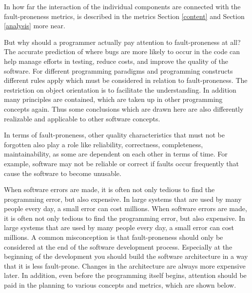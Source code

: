 In how far the interaction of the individual components are connected with the fault-proneness metrics, is described in the metrics Section \ref{content} and Section \ref{analysis} more near.

But why should a programmer actually pay attention to fault-proneness at all? The accurate prediction of where bugs are more likely to occur in the code can help manage efforts in testing, reduce costs, and improve the quality of the software. For different programming paradigms and programming constructs different rules apply which must be considered in relation to fault-proneness.  The restriction on object orientation is to facilitate the understanding. In addition many principles are contained, which are taken up in other programming concepts again. Thus some conclusions which are drawn here are also differently realizable and applicable to other software concepts.

In terms of fault-proneness, other quality characteristics that must not be forgotten also play a role like reliability, correctness, completeness, maintainability, as some are dependent on each other in terms of time. For example, software may not be reliable or correct if faults occur frequently that cause the software to become unusable.

When software errors are made, it is often not only tedious to find the programming error, but also expensive. In large systems that are used by many people every day, a small error can cost millions. When software errors are made, it is often not only tedious to find the programming error, but also expensive. In large systems that are used by many people every day, a small error can cost millions. A common misconception is that fault-proneness should only be considered at the end of the software development process. Especially at the beginning of the development you should build the software architecture in a way that it is less fault-prone. Changes in the architecture are always more expensive later. In addition, even before the programming itself begins, attention should be paid in the planning to various concepts and metrics, which are shown below.